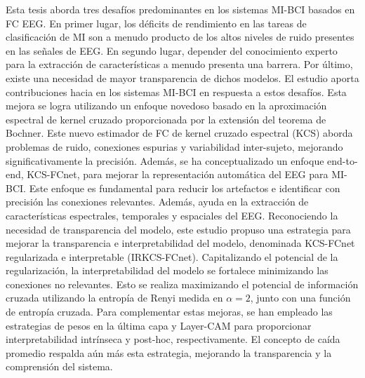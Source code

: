 Esta tesis aborda tres desafíos predominantes en los sistemas MI-BCI basados en FC EEG. En primer lugar, los déficits de rendimiento en las tareas de clasificación de MI son a menudo producto de los altos niveles de ruido presentes en las señales de EEG. En segundo lugar, depender del conocimiento experto para la extracción de características a menudo presenta una barrera. Por último, existe una necesidad de mayor transparencia de dichos modelos. El estudio aporta contribuciones hacia  en los sistemas MI-BCI en respuesta a estos desafíos. Esta mejora se logra utilizando un enfoque novedoso basado en la aproximación espectral de kernel cruzado proporcionada por la extensión del teorema de Bochner. Este nuevo estimador de FC de kernel cruzado espectral (KCS) aborda problemas de ruido, conexiones espurias y variabilidad inter-sujeto, mejorando significativamente la precisión. Además, se ha conceptualizado un enfoque end-to-end, KCS-FCnet, para mejorar la representación automática del EEG para MI-BCI. Este enfoque es fundamental para reducir los artefactos e identificar con precisión las conexiones relevantes. Además, ayuda en la extracción de características espectrales, temporales y espaciales del EEG. Reconociendo la necesidad de transparencia del modelo, este estudio propuso una estrategia para mejorar la transparencia e interpretabilidad del modelo, denominada KCS-FCnet regularizada e interpretable (IRKCS-FCnet). Capitalizando el potencial de la regularización, la interpretabilidad del modelo se fortalece minimizando las conexiones no relevantes. Esto se realiza maximizando el potencial de información cruzada utilizando la entropía de Renyi medida en $\alpha=2$, junto con una función de entropía cruzada. Para complementar estas mejoras, se han empleado las estrategias de pesos en la última capa y Layer-CAM para proporcionar interpretabilidad intrínseca y post-hoc, respectivamente. El concepto de caída promedio respalda aún más esta estrategia, mejorando la transparencia y la comprensión del sistema.

